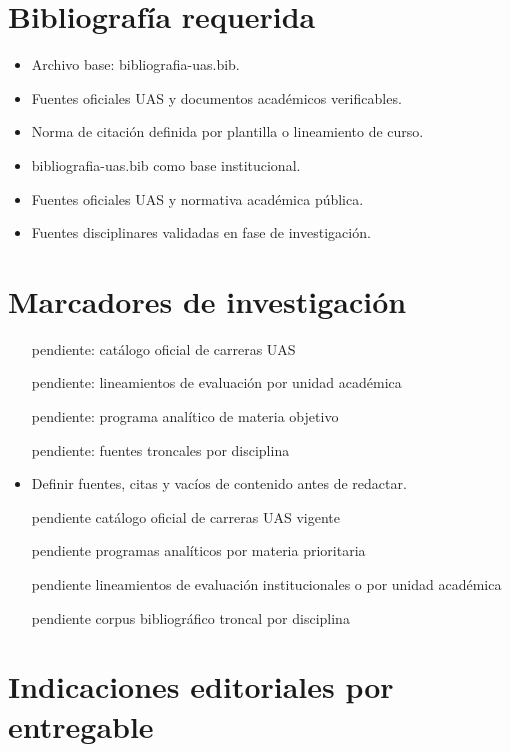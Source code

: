 \documentclass[12pt]{article}
\begin{document}
\section*{Bibliografía requerida}
\begin{itemize}[leftmargin=*]
  \item Archivo base: bibliografia-uas.bib.
  \item Fuentes oficiales UAS y documentos académicos verificables.
  \item Norma de citación definida por plantilla o lineamiento de curso.
  \item bibliografia-uas.bib como base institucional.
  \item Fuentes oficiales UAS y normativa académica pública.
  \item Fuentes disciplinares validadas en fase de investigación.
\end{itemize}

\section*{Marcadores de investigación}
\begin{itemize}[leftmargin=*]
  \item [pendiente: catálogo oficial de carreras UAS]
  \item [pendiente: lineamientos de evaluación por unidad académica]
  \item [pendiente: programa analítico de materia objetivo]
  \item [pendiente: fuentes troncales por disciplina]
  \item Definir fuentes, citas y vacíos de contenido antes de redactar.
  \item [pendiente] catálogo oficial de carreras UAS vigente
  \item [pendiente] programas analíticos por materia prioritaria
  \item [pendiente] lineamientos de evaluación institucionales o por unidad académica
  \item [pendiente] corpus bibliográfico troncal por disciplina
\end{itemize}

\section*{Indicaciones editoriales por entregable}
\end{document}
